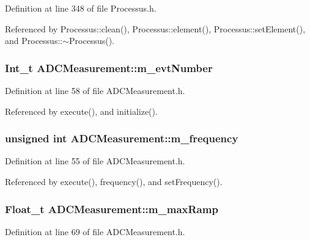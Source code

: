Definition at line 348 of file Processus.h.

Referenced by Processus::clean(), Processus::element(), Processus::setElement(), and Processus::$\sim$Processus().\hypertarget{classADCMeasurement_ae21dcb1aeff71570c870648839a0c914}{
\subsubsection[{m\_\-evtNumber}]{\setlength{\rightskip}{0pt plus 5cm}Int\_\-t {\bf ADCMeasurement::m\_\-evtNumber}}}
\label{classADCMeasurement_ae21dcb1aeff71570c870648839a0c914}


Definition at line 58 of file ADCMeasurement.h.

Referenced by execute(), and initialize().\hypertarget{classADCMeasurement_ab4a0653cc015ddf9b33b877c1d43b260}{
\subsubsection[{m\_\-frequency}]{\setlength{\rightskip}{0pt plus 5cm}unsigned int {\bf ADCMeasurement::m\_\-frequency}}}
\label{classADCMeasurement_ab4a0653cc015ddf9b33b877c1d43b260}


Definition at line 55 of file ADCMeasurement.h.

Referenced by execute(), frequency(), and setFrequency().\hypertarget{classADCMeasurement_a5e1f799c05f5781004a9081c4064e4a8}{
\subsubsection[{m\_\-maxRamp}]{\setlength{\rightskip}{0pt plus 5cm}Float\_\-t {\bf ADCMeasurement::m\_\-maxRamp}}}
\label{classADCMeasurement_a5e1f799c05f5781004a9081c4064e4a8}


Definition at line 69 of file ADCMeasurement.h.

